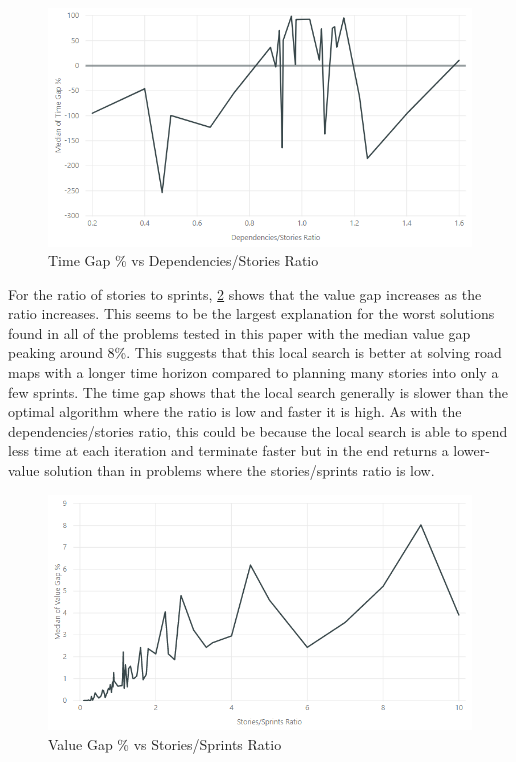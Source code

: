 \begin{figure}[h!]
    \centering
    \includegraphics[width=\textwidth]{Figures/Results/annealing_time_gap_dependencies_stories.png}
    \caption{Time Gap \% vs Dependencies/Stories Ratio}
    \label{fig:time_gap_vs_dependencies_stories}
\end{figure}

For the ratio of stories to sprints, \cref{fig:value_gap_vs_stories_sprints} shows that the value gap increases as the ratio increases. This seems to be the largest explanation for the worst solutions found in all of the problems tested in this paper with the median value gap peaking around 8\%. This suggests that this local search is better at solving road maps with a longer time horizon compared to planning many stories into only a few sprints. The time gap shows that the local search generally is slower than the optimal algorithm where the ratio is low and faster it is high. As with the dependencies/stories ratio, this could be because the local search is able to spend less time at each iteration and terminate faster but in the end returns a lower-value solution than in problems where the stories/sprints ratio is low.

\begin{figure}[h!]
    \centering
    \includegraphics[width=\textwidth]{Figures/Results/annealing_value_gap_stories_sprints.png}
    \caption{Value Gap \% vs Stories/Sprints Ratio}
    \label{fig:value_gap_vs_stories_sprints}
\end{figure}

